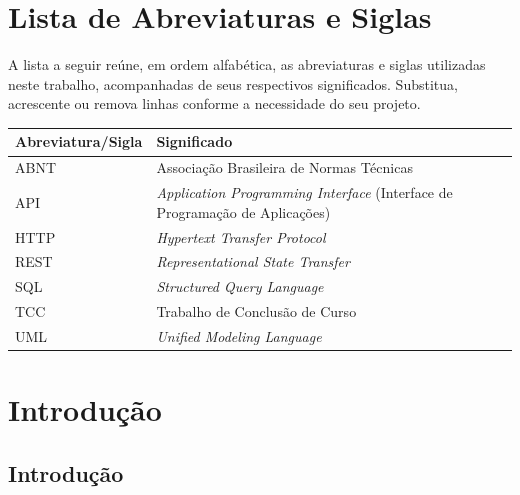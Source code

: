 \documentclass[
    12pt,                %
    openright,           %
    oneside,             %
    a4paper,             %
    english,             %
    brazil               %
]{abntex2}
\begin{document}
\chapter*{Lista de Abreviaturas e Siglas}

\noindent A lista a seguir reúne, em ordem alfabética, as abreviaturas e siglas utilizadas neste trabalho, acompanhadas de seus respectivos significados. Substitua, acrescente ou remova linhas conforme a necessidade do seu projeto.

\vspace{\onelineskip}

\begin{center}
\begin{tabular}{@{}p{3.2cm}p{}@{}}
\toprule
\textbf{Abreviatura/Sigla} & \textbf{Significado} \\
\midrule
ABNT  & Associação Brasileira de Normas Técnicas \\
API   & \textit{Application Programming Interface} (Interface de Programação de Aplicações) \\
HTTP  & \textit{Hypertext Transfer Protocol} \\
REST  & \textit{Representational State Transfer} \\
SQL   & \textit{Structured Query Language} \\
TCC   & Trabalho de Conclusão de Curso \\
UML   & \textit{Unified Modeling Language} \\
\bottomrule
\end{tabular}
\end{center}

\cleardoublepage

\tableofcontents*
\cleardoublepage

\textual

\chapter{Introdução}
\label{cap:introducao}
\section{Introdução}
\end{document}
